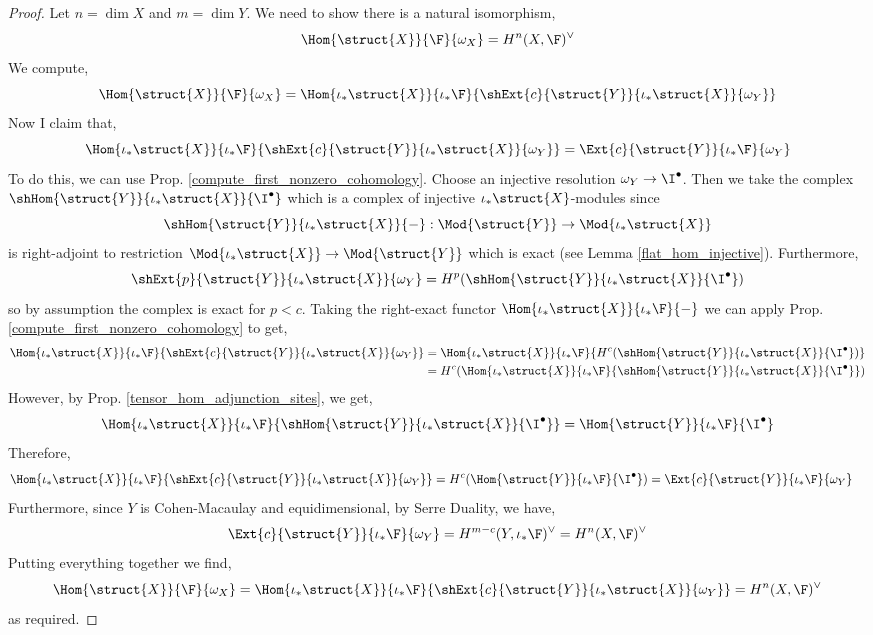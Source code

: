 \documentclass[12pt]{article}
\begin{document}
\begin{proof}
Let $n = \dim{X}$ and $m = \dim{Y}$.
We need to show there is a natural isomorphism,
\[ \Hom{\struct{X}}{\F}{\omega_X} = H^n(X, \F)^\vee \]
We compute,
\[ \Hom{\struct{X}}{\F}{\omega_X} = \Hom{\iota_* \struct{X}}{\iota_* \F}{\shExt{c}{\struct{Y}}{\iota_* \struct{X}}{\omega_Y}} \]
Now I claim that,
\[ \Hom{\iota_* \struct{X}}{\iota_* \F}{\shExt{c}{\struct{Y}}{\iota_* \struct{X}}{\omega_Y}} = \Ext{c}{\struct{Y}}{\iota_* \F}{\omega_Y} \]
To do this, we can use Prop. \ref{compute_first_nonzero_cohomology}.  Choose an injective resolution $\omega_Y \to \I^\bullet$. Then we take the complex $\shHom{\struct{Y}}{\iota_* \struct{X}}{\I^\bullet}$ which is a complex of injective $\iota_* \struct{X}$-modules since  \[ \shHom{\struct{Y}}{\iota_* \struct{X}}{-} : \Mod{\struct{Y}} \to \Mod{\iota_* \struct{X}} \] is right-adjoint to restriction $\Mod{\iota_* \struct{X}} \to \Mod{\struct{Y}}$ which is exact (see Lemma \ref{flat_hom_injective}). Furthermore,
\[ \shExt{p}{\struct{Y}}{\iota_* \struct{X}}{\omega_Y} = H^p(\shHom{\struct{Y}}{\iota_* \struct{X}}{\I^\bullet}) \]
so by assumption the complex is exact for $p < c$. 
Taking the right-exact functor $\Hom{\iota_* \struct{X}}{\iota_* \F}{-}$ we can apply Prop. \ref{compute_first_nonzero_cohomology} to get,
\begin{align*}
\Hom{\iota_* \struct{X}}{\iota_* \F}{\shExt{c}{\struct{Y}}{\iota_* \struct{X}}{\omega_Y}} & = \Hom{\iota_* \struct{X}}{\iota_* \F}{H^c(\shHom{\struct{Y}}{\iota_* \struct{X}}{\I^\bullet})}
\\
& = H^c(\Hom{\iota_* \struct{X}}{\iota_* \F}{\shHom{\struct{Y}}{\iota_* \struct{X}}{\I^\bullet}})
\end{align*}
However, by Prop. \ref{tensor_hom_adjunction_sites}, we get,
\[ \Hom{\iota_* \struct{X}}{\iota_* \F}{\shHom{\struct{Y}}{\iota_* \struct{X}}{\I^\bullet}}  = \Hom{\struct{Y}}{\iota_* \F}{\I^\bullet} \]
Therefore,
\begin{align*}
\Hom{\iota_* \struct{X}}{\iota_* \F}{\shExt{c}{\struct{Y}}{\iota_* \struct{X}}{\omega_Y}} & = H^c(\Hom{\struct{Y}}{\iota_* \F}{\I^\bullet}) = \Ext{c}{\struct{Y}}{\iota_* \F}{\omega_Y} 
\end{align*}
Furthermore, since $Y$ is Cohen-Macaulay and equidimensional, by Serre Duality, we have,
\[ \Ext{c}{\struct{Y}}{\iota_* \F}{\omega_Y} = H^{m-c}(Y, \iota_* \F)^\vee = H^{n}(X, \F)^\vee \]
Putting everything together we find,
\[ \Hom{\struct{X}}{\F}{\omega_X} = \Hom{\iota_* \struct{X}}{\iota_* \F}{\shExt{c}{\struct{Y}}{\iota_* \struct{X}}{\omega_Y}} = H^{n}(X, \F)^\vee \]
as required.
\end{proof}
\end{document}
